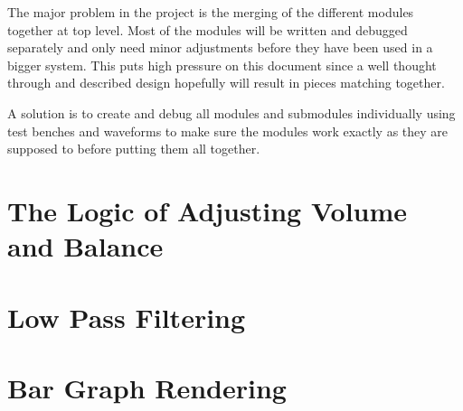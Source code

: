 

The major problem in the project is the merging of the different modules together
at top level. Most of the modules will be written and debugged separately and
only need minor adjustments before they have been used in a bigger system.
This puts high pressure on this document since a well thought through and described
design hopefully will result in pieces matching together.

A solution is to create and debug all modules and submodules individually
using test benches and waveforms to make sure the modules work exactly as
they are supposed to before putting them all together.

\section{The Logic of Adjusting Volume and Balance}


\section{Low Pass Filtering}


\section{Bar Graph Rendering}

